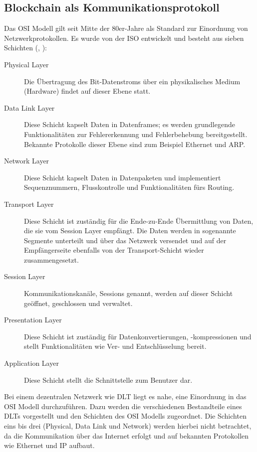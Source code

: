 \subsection{Blockchain als Kommunikationsprotokoll}
\label{subsec:fundamentals:dlt:protocol}
Das \ac{OSI} Modell gilt seit Mitte der 80er-Jahre als Standard zur Einordnung von Netzwerkprotokollen. Es wurde von der \ac{ISO} entwickelt und besteht aus sieben Schichten (\cite{OSI1980}, \cite{osi2014}):
\begin{description}
  \item[Physical Layer] Die Übertragung des Bit-Datenstroms über ein physikalisches Medium (Hardware) findet auf dieser Ebene statt.
  \item[Data Link Layer] Diese Schicht kapselt Daten in Datenframes; es werden grundlegende Funktionalitäten zur Fehlererkennung und Fehlerbehebung bereitgestellt. Bekannte Protokolle dieser Ebene sind zum Beispiel Ethernet und \ac{ARP}.
  \item[Network Layer] Diese Schicht kapselt Daten in Datenpaketen und implementiert Sequenznummern, Flusskontrolle und Funktionalitäten fürs Routing.
  \item[Transport Layer] Diese Schicht ist zuständig für die Ende-zu-Ende Übermittlung von Daten, die sie vom Session Layer empfängt. Die Daten werden in sogenannte Segmente unterteilt und über das Netzwerk versendet und auf der Empfängerseite ebenfalls von der Transport-Schicht wieder zusammengesetzt.
  \item[Session Layer] Kommunikationskanäle, Sessions genannt, werden auf dieser Schicht geöffnet, geschlossen und verwaltet.
  \item[Presentation Layer] Diese Schicht ist zuständig für Datenkonvertierungen, -kompressionen und stellt Funktionalitäten wie Ver- und Entschlüsselung bereit.
  \item[Application Layer] Diese Schicht stellt die Schnittstelle zum Benutzer dar.
\end{description}

Bei einem dezentralen Netzwerk wie \ac{DLT} liegt es nahe, eine Einordnung in das \ac{OSI} Modell durchzuführen. Dazu werden die verschiedenen Bestandteile eines \ac{DLT}s vorgestellt und den Schichten des \ac{OSI} Modells zugeordnet. Die Schichten eins bis drei (Physical, Data Link und Network) werden hierbei nicht betrachtet, da die Kommunikation über das Internet erfolgt und auf bekannten Protokollen wie Ethernet und IP aufbaut.

